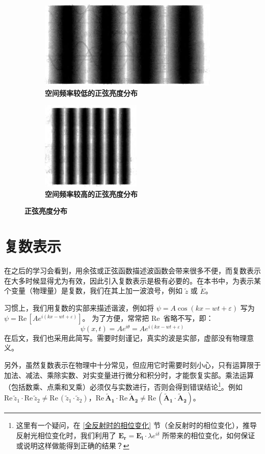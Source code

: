 \documentclass[UTF8]{report}
\def\Re{\mathrm{Re}\,}
\theoremstyle{MyLineTheoremStyle} %
\theoremstyle{MyBlockTheoremStyle} %
\theoremstyle{MySubsubsectionStyle} %
\begin{document}
\begin{figure}[H]\centering
\begin{subfigure}[t]{0.62\columnwidth}\centering
    \includegraphics[height=120pt]{assets/1,2/image (41).jpg}
    \caption{\bfseries 空间频率较低的正弦亮度分布 }
\end{subfigure}\begin{subfigure}[t]{0.37\columnwidth}\centering
    \includegraphics[height=120pt]{assets/1,2/image (42).jpg}
    \caption{\bfseries 空间频率较高的正弦亮度分布 }
\end{subfigure}
\caption{\bfseries 正弦亮度分布 }
\end{figure}

\section{复数表示}
在之后的学习会看到，用余弦或正弦函数描述波函数会带来很多不便，而复数表示在大多时候显得尤为有效，因此引入复数表示是极有必要的。在本书中，为表示某个变量（物理量）是复数，我们在其上加一波浪号，例如 $\tilde{z}$ 或 $\tilde{E}$。

习惯上，我们用复数的实部来描述谐波，例如将 $\psi = A \cos(kx - wt + \varepsilon)$ 写为 $\psi = \Re [A e^{i (kx - wt + \varepsilon)}]$。
为了方便，常常把 $\Re$ 省略不写，即：
\begin{equation}
    \psi(x,t) = A e^{i \theta} = A e^{i (kx - wt + \varepsilon)}
\end{equation}
在后文，我们也采用此简写。需要时刻谨记，真实的波是实部，虚部没有物理意义。

另外，虽然复数表示在物理中十分常见，但应用它时需要时刻小心，只有运算限于加法、减法、乘除实数、对实变量进行微分和积分时，才能恢复实部。乘法运算（包括数乘、点乘和叉乘）必须仅与实数进行，否则会得到错误结论\footnote{这里有一个疑问，在 \ref{全反射时的相位变化} 节（全反射时的相位变化），推导反射光相位变化时，我们利用了 $\boldsymbol{E_r} = \boldsymbol{E_i}\cdot \lambda e^{i \delta} $ 所带来的相位变化，如何保证或说明这样做能得到正确的结果？}。例如 $\Re \tilde{z}_1 \cdot \Re \tilde{z}_2 \ne \Re (\tilde{z}_1\cdot \tilde{z}_2)$，$\Re \boldsymbol{\tilde{A}_1 }\cdot \Re \boldsymbol{\tilde{A}_2 }\ne \Re (\boldsymbol{\tilde{A}_1} \cdot \boldsymbol{\tilde{A}_2})$。
\end{document}
